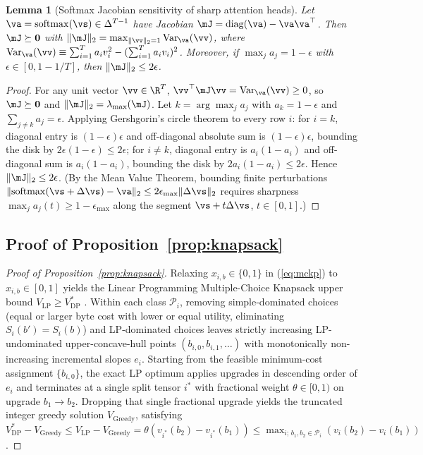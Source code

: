 \documentclass[10pt]{article} %
\renewcommand{\eqref}[1]{(\ref{#1})}
\newtheorem{lemma}{Lemma}
\begin{document}
\begin{lemma}[Softmax Jacobian sensitivity of sharp attention heads]
\label{lem:softmax}
Let $\va = \mathrm{softmax}(\vs) \in \Delta^{T-1}$ have Jacobian $\mJ = \mathrm{diag}(\va) - \va\va^\top$. Then $\mJ \succeq \mathbf{0}$ with $\|\mJ\|_2 = \max_{\|\vv\|_2=1} \mathrm{Var}_{\va}(\vv)$, where $\mathrm{Var}_{\va}(\vv) \equiv \sum_{i=1}^T a_i v_i^2 - (\sum_{i=1}^T a_i v_i)^2$. Moreover, if $\max_j a_j = 1 - \epsilon$ with $\epsilon \in [0, 1 - 1/T]$, then $\|\mJ\|_2 \le 2\epsilon$.
\end{lemma}

\begin{proof}
For any unit vector $\vv \in \R^T$, $\vv^\top \mJ \vv = \mathrm{Var}_{\va}(\vv) \ge 0$, so $\mJ \succeq \mathbf{0}$ and $\|\mJ\|_2 = \lambda_{\max}(\mJ)$. Let $k = \arg\max_j a_j$ with $a_k = 1-\epsilon$ and $\sum_{j \ne k} a_j = \epsilon$. Applying Gershgorin's circle theorem to every row $i$: for $i=k$, diagonal entry is $(1-\epsilon)\epsilon$ and off-diagonal absolute sum is $(1-\epsilon)\epsilon$, bounding the disk by $2\epsilon(1-\epsilon) \le 2\epsilon$; for $i \ne k$, diagonal entry is $a_i(1-a_i)$ and off-diagonal sum is $a_i(1-a_i)$, bounding the disk by $2a_i(1-a_i) \le 2\epsilon$. Hence $\|\mJ\|_2 \le 2\epsilon$. (By the Mean Value Theorem, bounding finite perturbations $\|\mathrm{softmax}(\vs + \Delta\vs) - \va\|_2 \le 2\epsilon_{\max}\|\Delta\vs\|_2$ requires sharpness $\max_j a_j(t) \ge 1 - \epsilon_{\max}$ along the segment $\vs + t\Delta\vs$, $t \in [0,1]$.)
\end{proof}

\subsection{Proof of Proposition~\ref{prop:knapsack}}
\label{app:knapsack_proof}

\begin{proof}[Proof of Proposition~\ref{prop:knapsack}]
Relaxing $x_{i,b} \in \{0,1\}$ in \eqref{eq:mckp} to $x_{i,b} \in [0,1]$ yields the Linear Programming Multiple-Choice Knapsack upper bound $V_{\mathrm{LP}} \ge V_{\mathrm{DP}}^*$ \citep{kellerer2004knapsack}. Within each class $\mathcal{P}_i$, removing simple-dominated choices (equal or larger byte cost with lower or equal utility, eliminating $S_i(b') = S_i(b)$) and LP-dominated choices leaves strictly increasing LP-undominated upper-concave-hull points $(b_{i,0}, b_{i,1}, \dots)$ with monotonically non-increasing incremental slopes $e_i$. Starting from the feasible minimum-cost assignment $\{b_{i,0}\}$, the exact LP optimum applies upgrades in descending order of $e_i$ and terminates at a single split tensor $i^*$ with fractional weight $\theta \in [0,1)$ on upgrade $b_1 \to b_2$. Dropping that single fractional upgrade yields the truncated integer greedy solution $V_{\mathrm{Greedy}}$, satisfying $V_{\mathrm{DP}}^* - V_{\mathrm{Greedy}} \le V_{\mathrm{LP}} - V_{\mathrm{Greedy}} = \theta(v_{i^*}(b_2) - v_{i^*}(b_1)) \le \max_{i;\, b_1, b_2 \in \mathcal{P}_i}(v_i(b_2) - v_i(b_1))$.
\end{proof}
\end{document}
